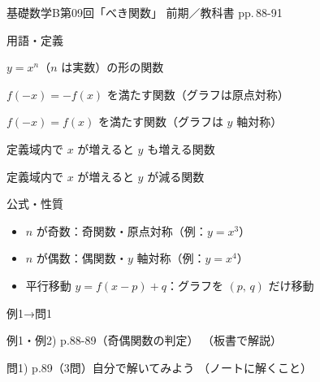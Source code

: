 \documentclass[aspectratio=43,professionalfonts,handout]{beamer}
\newcommand{\LectureNum}{09}
\newcommand{\LectureTitle}{べき関数}
\newcommand{\TextPages}{pp.\,88-91}
\newcommand{\CourseName}{基礎数学B}
\renewcommand{\TermName}{前期}
\begin{document}
\begin{frame}{\CourseName\quad 第\LectureNum 回「\LectureTitle 」}
  {\small \TermName\quad \TeacherName\quad ／\quad 教科書 \TextPages}

  \begin{block}{用語・定義}
  \begin{description}[labelwidth=5.5em]
    \item[\kw{べき関数}] $y=x^n$（$n$ は実数）の形の関数
    \item[\kw{奇関数}] $f(-x)=-f(x)$ を満たす関数（グラフは原点対称）
    \item[\kw{偶関数}] $f(-x)=f(x)$ を満たす関数（グラフは $y$ 軸対称）
    \item[\kw{単調増加}] 定義域内で $x$ が増えると $y$ も増える関数
    \item[\kw{単調減少}] 定義域内で $x$ が増えると $y$ が減る関数
  \end{description}
  \end{block}
\end{frame}

\begin{frame}{公式・性質}
  \begin{block}{}
  \begin{itemize}
    \item $n$ が奇数：奇関数・原点対称（例：$y=x^3$）
    \item $n$ が偶数：偶関数・$y$ 軸対称（例：$y=x^4$）
    \item 平行移動 $y=f(x-p)+q$：グラフを $(p,\,q)$ だけ移動
  \end{itemize}
  \end{block}
\end{frame}

\begin{frame}{例1→問1}
  \begin{exampleblock}{例1・例2) p.88-89（奇偶関数の判定）}
    （板書で解説）
  \end{exampleblock}

  \vfill

  \begin{block}{問1) p.89（3問）\quad 自分で解いてみよう}
    （ノートに解くこと）
  \end{block}
\end{frame}
\end{document}
